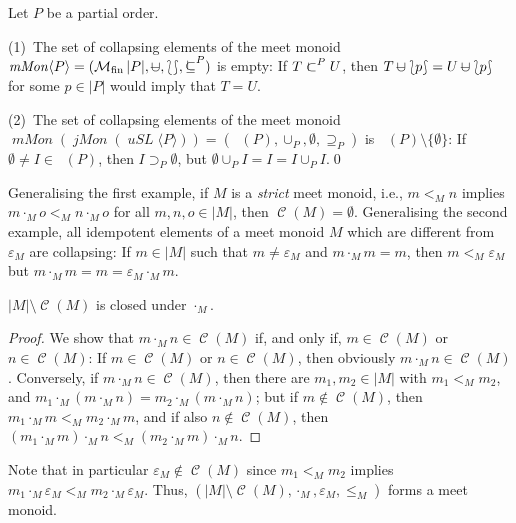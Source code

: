 \documentclass[english]{notes}
\let\lbagold\lbag
\let\rbagold\rbag
\def\lbag{\mathopen{\lbagold}}
\def\rbag{\mathclose{\rbagold}}
\DeclareMathOperator{\incsets}{\mathcal{I}}
\DeclareMathOperator{\incfinsets}{\incsets_{\mathrm{fin}}}
\newcommand{\lowersupseteq}[1]{\mathrel{\supseteq_{#1}}}
\newcommand{\lowersupset}[1]{\mathrel{\supset_{#1}}}
\newcommand{\lowercup}[1]{\mathbin{\cup_{#1}}}
\DeclareMathOperator{\finmsets}{\mathcal{M}_{\mathrm{fin}}}
\newcommand{\mcup}{\mathbin{\mathnormal{\cup}\llap{\text{\fontsize{10pt}{10pt}\selectfont$-$}}}}
\newcommand{\submseteq}{%
\mathrel{\mathchoice%
{\mathnormal{\subseteq}\llap{\text{\raisebox{0.3pt}{\fontsize{10pt}{10pt}\selectfont\rotatebox{90}{$-$}\hspace{2.5pt}}}}}%
{\mathnormal{\subseteq}\llap{\text{\raisebox{0.3pt}{\fontsize{10pt}{10pt}\selectfont\rotatebox{90}{$-$}\hspace{2.5pt}}}}}%
{\mathnormal{\subseteq}\llap{\text{\raisebox{-0.3pt}{\fontsize{7pt}{7pt}\selectfont\rotatebox{90}{$-$}\hspace{1pt}}}}}%
{\mathnormal{\subseteq}\llap{\text{\raisebox{-0.3pt}{\fontsize{7pt}{7pt}\selectfont\rotatebox{90}{$-$}\hspace{1pt}}}}}%
}}
\newcommand{\uppersubmseteq}[1]{\mathrel{\submseteq^{#1}}}
\newcommand{\submset}{%
\mathrel{\mathchoice%
{\mathnormal{\subset}\llap{\text{\raisebox{-0.8pt}{\fontsize{10pt}{10pt}\selectfont\rotatebox{90}{$-$}\hspace{2.5pt}}}}}%
{\mathnormal{\subset}\llap{\text{\raisebox{-0.8pt}{\fontsize{10pt}{10pt}\selectfont\rotatebox{90}{$-$}\hspace{2.5pt}}}}}%
{\mathnormal{\subset}\llap{\text{\raisebox{-0.3pt}{\fontsize{7pt}{7pt}\selectfont\rotatebox{90}{$-$}\hspace{1pt}}}}}%
{\mathnormal{\subset}\llap{\text{\raisebox{-0.3pt}{\fontsize{7pt}{7pt}\selectfont\rotatebox{90}{$-$}\hspace{1pt}}}}}%
}}
\newcommand{\uppersubmset}[1]{\mathrel{\submset^{#1}}}
\DeclareMathOperator{\collapseset}{\mathcal{C}}
\newcommand{\functor}[1]{\mathit{#1}}
\DeclareMathOperator{\uSLfun}{\functor{uSL}}
\DeclareMathOperator{\jMonfun}{\functor{jMon}}
\DeclareMathOperator{\mMonfun}{\functor{mMon}}
\newcommand{\uSLfree}[1]{\uSLfun\langle#1\rangle}
\newcommand{\mMonfree}[1]{\mMonfun\langle#1\rangle}
\begin{document}
\begin{example}
Let $P$ be a partial order.

\smallskip

(1)~The set of collapsing elements of the meet monoid
$\mMonfree{P} = (\finmsets |P|, {\mcup}, \lbag \rbag,
{\uppersubmseteq{P}})$
is empty: If $T \uppersubmset{P} U$, then
$T \mcup \lbag p \rbag = U \mcup \lbag p \rbag$ for some $p \in |P|$
would imply that $T = U$.

\smallskip

(2)~The set of collapsing elements of the meet monoid
$\mMonfun(\jMonfun(\uSLfree{P})) = (\incfinsets(P), \cup_P,
\emptyset, {\lowersupseteq{P}})$
is $\incfinsets(P) \setminus \{ \emptyset \}$: If
$\emptyset \neq I \in \incfinsets(P)$, then
$I \lowersupset{P} \emptyset$, but
$\emptyset \lowercup{P} I = I = I \lowercup{P} I$.\qed
\end{example}

Generalising the first example, if $M$ is a \emph{strict} meet monoid,
i.e., $m <_M n$ implies $m \cdot_M o <_M n \cdot_M o$ for all $m, n, o
\in |M|$, then $\collapseset(M) = \emptyset$.  Generalising the second
example, all idempotent elements of a meet monoid $M$ which are
different from $\varepsilon_M$ are collapsing: If $m \in |M|$ such
that $m \neq \varepsilon_M$ and $m \cdot_M m = m$, then $m <_M
\varepsilon_M$ but $m \cdot_M m = m = \varepsilon_M \cdot_M m$.

\begin{lemma}
$|M| \setminus \collapseset(M)$ is closed under $\cdot_M$. 
\end{lemma}
\begin{proof}
We show that $m \cdot_M n \in \collapseset(M)$ if, and only if,
$m \in \collapseset(M)$ or $n \in \collapseset(M)$: If
$m \in \collapseset(M)$ or $n \in \collapseset(M)$, then obviously
$m \cdot_M n \in \collapseset(M)$.  Conversely, if
$m \cdot_M n \in \collapseset(M)$, then there are $m_1, m_2 \in |M|$
with $m_1 <_M m_2$, and
$m_1 \cdot_M (m \cdot_M n) = m_2 \cdot_M (m \cdot_M n)$; but if
$m \notin \collapseset(M)$, then $m_1 \cdot_M m <_M m_2 \cdot_M m$,
and if also $n \notin \collapseset(M)$, then
$(m_1 \cdot_M m) \cdot_M n <_M (m_2 \cdot_M m) \cdot_M n$.
\end{proof}

Note that in particular $\varepsilon_M \notin \collapseset(M)$ since
$m_1 <_M m_2$ implies $m_1 \cdot_M \varepsilon_M <_M m_2 \cdot_M
\varepsilon_M$.  Thus, $(|M| \setminus \collapseset(M), {\cdot_M},
\varepsilon_M, {\leq_M})$ forms a meet monoid.
\end{document}

